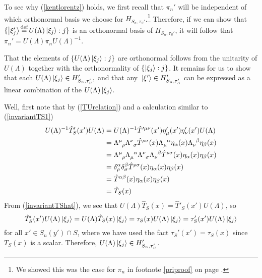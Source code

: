 To see why (\ref{kentlorentz}) holds, we first recall that $\pi_n'$ will be independent of which orthonormal basis we choose for $H_{S_n,\tau_S'}$.\footnote{We showed this was the case for $\pi_n$ in footnote \ref{priproof} on page \pageref{priproof}.} Therefore, if we can show that $\{\ket{\xi_j'}\myeq U(\Lambda)\ket{\xi_j}:j\}$ is an orthonormal basis of $H_{S_n,\tau_S'}$, it will follow that $\pi_n'=U(\Lambda)\pi_nU(\Lambda)^{-1}$. 

That the elements of $\{U(\Lambda)\ket{\xi_j}:j\}$ are orthonormal follows from the unitarity of $U(\Lambda)$ together with the orthonormality of  $\{\ket{\xi_j}:j\}$. 
It remains for us to show that each $U(\Lambda)\ket*{\xi_j}\in H'_{S_n,\tau_S'},$ and that any $\ket*{\xi'}\in H'_{S_n,\tau_S'}$ can be expressed as a linear combination of the $U(\Lambda)\ket*{\xi_j}$.

Well, first note that by (\ref{TUrelation}) and a calculation similar to (\ref{invariantTS1})
\begin{equation}
\begin{split}\label{invariantTShat}
U(\Lambda)^{-1}\hat{T}'_S(x')U(\Lambda)&=U(\Lambda)^{-1}\hat{T}^{\prime\mu\nu}(x')\eta'_{\mu}(x')\eta'_{\nu}(x')U(\Lambda)\\
&=\Lambda\indices{^\mu_\rho}\Lambda\indices{^\nu_\sigma}\hat{T}^{\rho\sigma}(x)\Lambda\indices{_\mu^\alpha}\eta_{\alpha}(x)\Lambda\indices{_\nu^\beta}\eta_{\beta}(x)\\
&=\Lambda\indices{^\mu_\rho}\Lambda\indices{_\mu^\alpha} \Lambda\indices{^\nu_\sigma}\Lambda\indices{_\nu^\beta}\hat{T}^{\rho\sigma}(x)\eta_{\alpha}(x)\eta_{\beta}(x)\\
&=\delta^\alpha_\rho\delta^\beta_\sigma \hat{T}^{\rho\sigma}(x)\eta_{\alpha}(x)\eta_{\beta}(x)\\
&=\hat{T}^{\alpha\beta}(x)\eta_{\alpha}(x)\eta_{\beta}(x)\\
&=\hat{T}_S(x)
\end{split}
\end{equation}
From (\ref{invariantTShat}), we see that  $U(\Lambda)\hat{T}_S(x)=\hat{T}'_S(x')U(\Lambda)$, so
$$
\hat{T}_S'(x')U(\Lambda)\ket{\xi_j}=U(\Lambda)\hat{T}_S(x)\ket{\xi_j}=\tau_S(x)U(\Lambda)\ket{\xi_j}=\tau_S'(x')U(\Lambda)\ket{\xi_j}
$$
for all $x'\in S_n(y')\cap S$, where we have used the fact $\tau_S'(x')=\tau_S(x)$ since $T_S(x)$ is a scalar. Therefore, $U(\Lambda)\ket{\xi_j}\in H'_{S_n,\tau_S'}$. 

